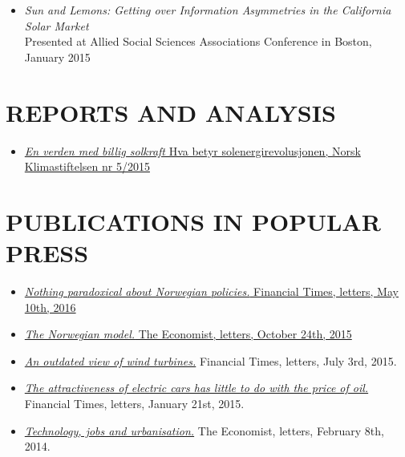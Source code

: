 \documentclass[margin]{res}
\begin{document}
\begin{resume}
\begin{itemize}
\item[] \emph {Sun and Lemons: Getting over Information Asymmetries in the California Solar Market} \\
Presented at Allied Social Sciences Associations Conference in Boston, January 2015 \\
\end{itemize}

\section{REPORTS AND ANALYSIS} 
\begin{itemize} 
\setlength{\itemsep}{5pt}
\item[] \href{http://klimastiftelsen.no/wp-content/uploads/2015/06/NK5_2015_Solenergirevolusjonen.pdf}{\emph{En verden med billig solkraft} Hva betyr solenergirevolusjonen, Norsk Klimastiftelsen nr 5/2015} 
\end{itemize}

\section{PUBLICATIONS IN POPULAR PRESS} 
\begin{itemize} 
\setlength{\itemsep}{5pt}
\item[] \href{https://next.ft.com/content/a9ca4ad4-15d8-11e6-9d98-00386a18e39d}{\emph{Nothing paradoxical about Norwegian policies.} Financial Times, letters, May 10th, 2016}

\item[] \href{http://www.economist.com/news/letters/21676738-letters}{\emph{The Norwegian model.} The Economist, letters, October 24th, 2015}

\item[] \href{http://www.ft.com/intl/cms/s/0/e22cba5c-1bfa-11e5-a130-2e7db721f996.html#axzz3giRBkRau}{\emph{An outdated view of wind turbines.}} Financial Times, letters, July 3rd, 2015.

\item[] \href{http://www.ft.com/intl/cms/s/0/313360bc-a00c-11e4-aa89-00144feab7de.html#axzz3PVKMfhY5}{\emph{The attractiveness of electric cars has little to do with the price of oil.}} Financial Times, letters, January 21st, 2015.

\item[] \href{http://www.economist.com/news/letters/21595871-livestock-and-emissions-california-technology-and-jobs-algorithms}{\emph{Technology, jobs and urbanisation.}}   The Economist, letters, February 8th, 2014.


\end{itemize}
\end{resume}
\end{document}
